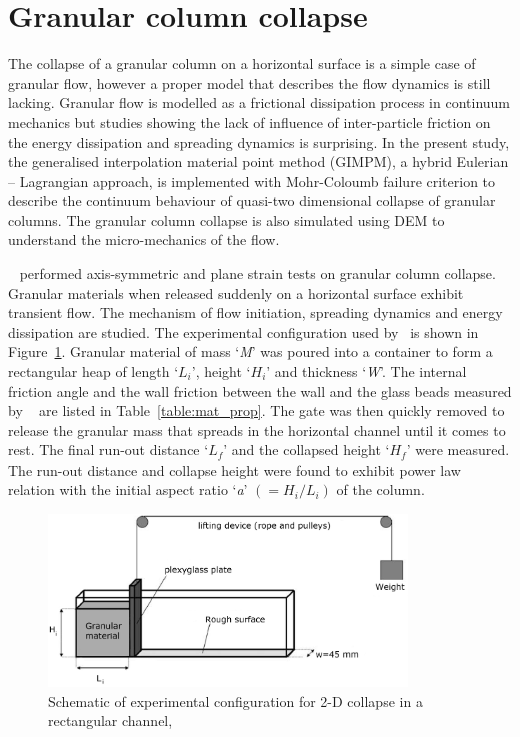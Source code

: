 \section{Granular column collapse}

The collapse of a granular column on a horizontal surface is a simple case of 
granular flow, however a proper model that describes the flow dynamics is still
lacking. Granular flow is modelled as a frictional dissipation process in 
continuum mechanics but studies showing the lack of influence of inter-particle 
friction on the energy dissipation and spreading dynamics is surprising. 
In the present study, the generalised interpolation material point method 
(GIMPM), a hybrid Eulerian -- Lagrangian approach, is implemented with 
Mohr-Coloumb failure criterion to describe the continuum behaviour of quasi-two 
dimensional collapse of granular columns. The granular column collapse is also 
simulated using DEM to understand the micro-mechanics of the flow.

~\citet{Lajeunesse2005} performed axis-symmetric and plane strain tests on 
granular column collapse. Granular materials when released suddenly on a 
horizontal surface exhibit transient flow. The mechanism of flow initiation, 
spreading dynamics and energy dissipation are studied. The experimental 
configuration used by~\citet{Lajeunesse2005} is shown in Figure~\ref{fig:exp}. 
Granular material of mass `\textit{M}' was poured into a container to form a 
rectangular heap of length `${L}_{\textit{i}}$', height `${H}_{\textit{i}}$' 
and thickness `\textit{W}'. The internal friction angle and the wall friction 
between the wall and the glass beads measured by ~\citet{Lajeunesse2005} are 
listed in Table~\ref{table:mat_prop}. The gate was then quickly removed to 
release the granular mass that spreads in the horizontal channel until it comes 
to rest. The final run-out distance `${L}_{\textit{f}}$' and the collapsed 
height `$H_{\textit{f}}$' were measured. The run-out distance and collapse 
height were found to exhibit power law relation with the initial aspect ratio 
`\textit{a}' $(=H_{\textit{i}}/L_{\textit{i}})$ of the column. 

\begin{figure}[tbhp]
\centering
\includegraphics[width=0.85\textwidth]{experiment_setup}
\caption{Schematic of experimental configuration for 2-D collapse in a 
rectangular channel,~\citep{Lajeunesse2005}}
\label{fig:exp}
\end{figure}

